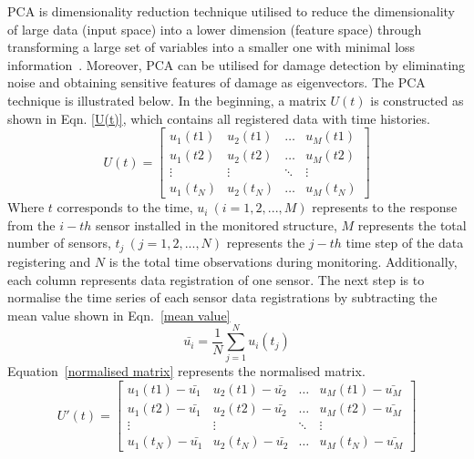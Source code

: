 PCA is dimensionality reduction technique utilised to reduce the dimensionality of large data (input space) into a lower dimension (feature space) through transforming a large set of variables into a smaller one with minimal loss information~\cite{Jolliffe2002}.
Moreover, PCA can be utilised for damage detection by eliminating noise and obtaining sensitive features of damage as eigenvectors.
The PCA technique is illustrated below.
In the beginning, a matrix \(U(t)\) is constructed as shown in Eqn. \ref{U(t)}, which contains all registered data with time histories.
\begin{equation}
	U(t)=
	\begin{bmatrix}
		u_1{(t1)}       & u_2{(t1)} & \dots & u_M{(t1)} \\
		u_1{(t2)}       & u_2{(t2)} & \dots & u_M{(t2)} \\
		\vdots 			& \vdots 	& \ddots & \vdots \\
		u_1{(t_N)}      & u_2{(t_N)} & \dots & u_M{(t_N)}
	\end{bmatrix}
	\label{U(t)}
\end{equation}
Where \(t\) corresponds to the time, \(u_i\ (i = 1, 2, ..., M)\) represents to the response from the \(i-th\) sensor installed in the monitored structure, \(M\) represents the total number of sensors, \(t_j\ (j = 1, 2, ..., N)\) represents the \(j-th\) time step of the data registering and \(N\) is the total time observations during monitoring.
Additionally, each column represents data registration of one sensor.
The next step is to normalise the time series of each sensor data registrations by subtracting the mean value shown in Eqn.~\ref{mean value}
\begin{equation}
	\bar{u_i} = \frac{1}{N}\sum_{j=1}^{N}u_i(t_j)
	\label{mean value}
\end{equation}
Equation~\ref{normalised matrix} represents the normalised matrix.
\begin{equation}
	U'(t)=
	\begin{bmatrix}
		u_1{(t1)}-\bar{u_1}       & u_2{(t1)}-\bar{u_2} & \dots  & u_M{(t1)}-\bar{u_M} \\
		u_1{(t2)}-\bar{u_1}       & u_2{(t2)}-\bar{u_2} & \dots  & u_M{(t2)}-\bar{u_M} \\
		\vdots 					  & \vdots 	  			& \ddots & \vdots \\
		u_1{(t_N)}-\bar{u_1}      & u_2{(t_N)}-\bar{u_2}& \dots  & u_M{(t_N)}-\bar{u_M}
	\end{bmatrix}
	\label{normalised matrix}
\end{equation}
